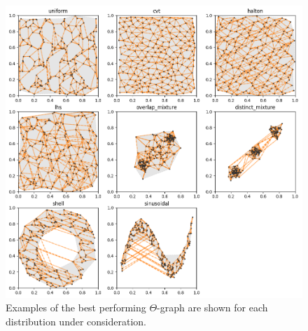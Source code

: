 \begin{figure}[htbp]
    \centering
    \includegraphics[width=\linewidth]{figs/chap7/theta_quality.png}
    \caption[Optimal $\Theta$-graphs for various two-dimensional distributions]{Examples of the best performing $\Theta$-graph are shown for each distribution under consideration.}
    \label{fig:theta_quality}
\end{figure}

